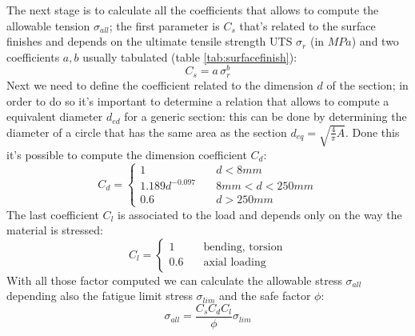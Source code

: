 \begin{multicols}
	The next stage is to calculate all the coefficients that allows to compute the allowable tension $\sigma_{all}$; the first parameter is $C_s$ that's related to the surface finishes and depends on the ultimate tensile strength UTS $\sigma_r$ (in $MPa$) and two coefficients $a,b$ usually tabulated (table \ref{tab:surfacefinish}):
	\begin{equation} \label{eq:surfacefinish}
		C_s = a \,\sigma_r ^b
	\end{equation}
	Next we need to define the coefficient related to the dimension $d$ of the section; in order to do so it's important to determine a relation that allows to compute a equivalent diameter $d_{ed}$	for a generic section: this can be done by determining the diameter of a circle that has the same area as the section $d_{eq} = \sqrt{\frac 4\pi A}$. Done this it's possible to compute the dimension coefficient $C_d$:
	\begin{equation}
		C_d = \begin{cases}
			1 & d< 8mm \\
			1.189 d^{-0.097} \quad & 8mm < d < 250mm \\
			0.6 & d > 250mm
		\end{cases}
	\end{equation}
	The last coefficient $C_l$ is associated to the load and depends only on the way the material is stressed:
	\begin{equation}
		C_{l} = \begin{cases}
			1 & \textrm{bending, torsion} \\
			0.6 \quad & \textrm{axial loading}
		\end{cases}
	\end{equation}
	With all those factor computed we can calculate the allowable stress $\sigma_{all}$ depending also the fatigue limit stress $\sigma_{lim}$ and the safe factor $\phi$:
	\begin{equation}
		\sigma_{all} = \frac{C_sC_dC_l}{\phi} \sigma_{lim}
	\end{equation} \vspace{3mm}


\end{multicols}
